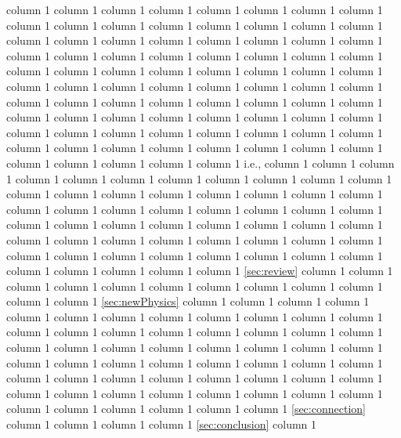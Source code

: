 \documentclass[a4paper,11pt]{article}
\newcommand*{\ie}{i.e., }
\begin{document}
  column 1  column 1  column 1  column 1  column 1  column 1  column 1  column 1  column 1  column 1  column 1   column 1  column 1  column 1  column 1  column 1  column 1  column 1  column 1  column 1  column 1  column 1   column 1  column 1  column 1  column 1  column 1  column 1  column 1  column 1   column 1  column 1  column 1  column 1  column 1  column 1   column 1  column 1  column 1  column 1     column 1  column 1  column 1  column 1  column 1  column 1  column 1   column 1  column 1  column 1  column 1  column 1  column 1  column 1  column 1  column 1  column 1 \cite{1012.2900}  column 1  column 1  column 1  column 1  column 1  column 1   column 1  column 1  column 1  column 1  column 1  column 1  column 1  column 1  column 1  column 1  column 1  column 1  column 1  column 1  column 1  column 1  column 1  column 1  column 1  column 1  column 1  column 1 \ie  column 1  column 1  column 1  column 1  column 1  column 1  column 1  column 1  column 1  column 1  column 1  column 1  column 1  column 1  column 1  column 1  column 1  column 1  column 1   column 1  column 1  column 1  column 1  column 1  column 1  column 1  column 1  column 1  column 1  column 1  column 1  column 1  column 1    column 1  column 1  column 1  column 1  column 1  column 1  column 1  column 1  column 1  column 1  column 1  column 1  column 1  column 1  column 1  column 1  column 1   
  column 1  column 1  column 1  column 1  column 1  column 1 \ref{sec:review}  column 1  column 1  column 1  column 1  column 1  column 1  column 1  column 1  column 1  column 1  column 1  column 1 \ref{sec:newPhysics}  column 1  column 1  column 1  column 1  column 1  column 1  column 1  column 1  column 1  column 1  column 1  column 1  column 1  column 1  column 1  column 1   column 1  column 1  column 1  column 1  column 1  column 1  column 1  column 1  column 1   column 1  column 1  column 1  column 1  column 1  column 1  column 1  column 1  column 1  column 1  column 1  column 1  column 1  column 1  column 1  column 1  column 1   column 1  column 1  column 1  column 1  column 1  column 1  column 1  column 1  column 1  column 1  column 1  column 1  column 1  column 1  column 1  column 1 \ref{sec:connection}  column 1  column 1  column 1  column 1 \ref{sec:conclusion}  column 1   
\end{document}
